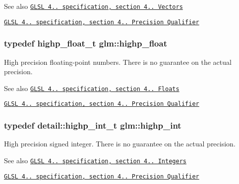 \begin{DoxySeeAlso}{See also}
\href{http://www.opengl.org/registry/doc/GLSLangSpec.4.20.8.pdf}{\tt G\+L\+SL 4.. specification, section 4.. Vectors} 

\href{http://www.opengl.org/registry/doc/GLSLangSpec.4.20.8.pdf}{\tt G\+L\+SL 4.. specification, section 4.. Precision Qualifier} 
\end{DoxySeeAlso}
\subsubsection[{\texorpdfstring{highp\+\_\+float}{highp_float}}]{\setlength{\rightskip}{0pt plus 5cm}typedef highp\+\_\+float\+\_\+t {\bf glm\+::highp\+\_\+float}}\hypertarget{group__core__precision_ga3d443a093adc053638ed7f81c5bfe300}{}\label{group__core__precision_ga3d443a093adc053638ed7f81c5bfe300}
High precision floating-\/point numbers. There is no guarantee on the actual precision.

\begin{DoxySeeAlso}{See also}
\href{http://www.opengl.org/registry/doc/GLSLangSpec.4.20.8.pdf}{\tt G\+L\+SL 4.. specification, section 4.. Floats} 

\href{http://www.opengl.org/registry/doc/GLSLangSpec.4.20.8.pdf}{\tt G\+L\+SL 4.. specification, section 4.. Precision Qualifier} 
\end{DoxySeeAlso}
\subsubsection[{\texorpdfstring{highp\+\_\+int}{highp_int}}]{\setlength{\rightskip}{0pt plus 5cm}typedef detail\+::highp\+\_\+int\+\_\+t {\bf glm\+::highp\+\_\+int}}\hypertarget{group__core__precision_gaafed5240eb0a43328cb75faf5fb0a8c2}{}\label{group__core__precision_gaafed5240eb0a43328cb75faf5fb0a8c2}
High precision signed integer. There is no guarantee on the actual precision.

\begin{DoxySeeAlso}{See also}
\href{http://www.opengl.org/registry/doc/GLSLangSpec.4.20.8.pdf}{\tt G\+L\+SL 4.. specification, section 4.. Integers} 

\href{http://www.opengl.org/registry/doc/GLSLangSpec.4.20.8.pdf}{\tt G\+L\+SL 4.. specification, section 4.. Precision Qualifier} 
\end{DoxySeeAlso}
